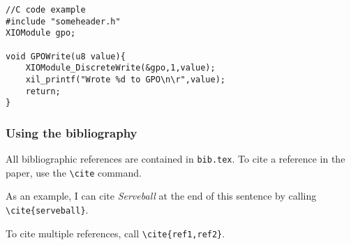 \singlespacing %
\begin{lstlisting}[style=C]
//C code example
#include "someheader.h"
XIOModule gpo;

void GPOWrite(u8 value){
	XIOModule_DiscreteWrite(&gpo,1,value);
	xil_printf("Wrote %d to GPO\n\r",value);
	return;
}
\end{lstlisting}
\doublespacing %

\subsubsection{Using the bibliography}
All bibliographic references are contained in \texttt{bib.tex}. To cite a reference in the paper, use the \verb!\cite! command.
\par
As an example, I can cite \textit{Serveball} at the end of this sentence by calling \verb!\cite{serveball}!.\cite{serveball}
\par
To cite multiple references, call \verb!\cite{ref1,ref2}!.\cite{serveball,porikli}
